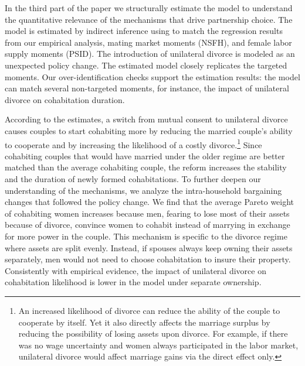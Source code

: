 \documentclass[12pt]{article}
\numberwithin{table}{section}
\begin{document}

In the third part of the paper we structurally estimate the model to understand the quantitative relevance of the mechanisms that drive partnership choice. The model is estimated by indirect inference using to match the regression results from our empirical analysis, mating market moments (NSFH), and female labor supply moments (PSID). The introduction of unilateral divorce is modeled as an unexpected policy change. The estimated model closely replicates the targeted moments. Our over-identification checks support the estimation results: the model can match several non-targeted moments, for instance, the impact of unilateral divorce on cohabitation duration.

According to the estimates, a switch from mutual consent to unilateral divorce causes couples to start cohabiting more by reducing the married couple's ability to cooperate and by increasing the likelihood of a costly divorce.\footnote{An increased likelihood of divorce can reduce the ability of the couple to cooperate by itself. Yet it also directly affects the marriage surplus by reducing the possibility of losing assets upon divorce. For example, if there was no wage uncertainty and women always participated in the labor market, unilateral divorce would affect marriage gains via the direct effect only.} Since cohabiting couples that would have married under the older regime are better matched than the average cohabiting couple, the reform increases the stability and the duration of newly formed cohabitations. To further deepen our understanding of the mechanisms, we analyze the intra-household bargaining changes that followed the policy change. We find that the average Pareto weight of cohabiting women increases because men, fearing to lose most of their assets because of divorce, convince women to cohabit instead of marrying in exchange for more power in the couple. This mechanism is specific to the divorce regime where assets are split evenly. Instead, if spouses always keep owning their assets separately, men would not need to choose cohabitation to insure their property. Consistently with empirical evidence, the impact of unilateral divorce on cohabitation likelihood is lower in the model under separate ownership. %
\end{document}
